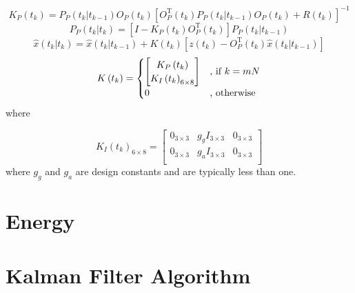 \documentclass[a4paper]{report}
\numberwithin{equation}{chapter}
\begin{document}
\begin{equation}
K_P \left( t_k \right) = P_P \left( t_k | t_{k - 1} \right) O_P \left( t_k \right) \left[ O^{\mathrm{T}}_P \left( t_k \right) P_P \left( t_k | t_{k - 1} \right) O_P \left( t_k \right) + R \left( t_k \right) \right]^{-1}
\end{equation}
\begin{equation}
P_P \left( t_k | t_k \right) = \left[ I - K_P \left( t_k \right) O_P^{\mathrm{T}} \left( t_k \right) \right] P_P \left( t_k | t_{k - 1} \right)
\end{equation}
\begin{equation}
\hat{x} \left( t_k | t_k \right) = \hat{x} \left( t_k | t_{k - 1} \right) + K \left( t_k \right) \left[ z \left( t_k \right) - O_P^{\mathrm{T}} \left( t_k \right) \hat{x} \left( t_k | t_{k - 1} \right) \right]
\end{equation}
\begin{equation}
K \left( t_k \right) = 
\begin{cases}
\begin{bmatrix}
K_P \left( t_k \right)\\
K_I \left( t_k \right)_{6 \times 8}\\
\end{bmatrix}
& \text{, if $ k = mN$} \\
0 & \text{, otherwise}
\end{cases}
\end{equation}
where

\begin{equation}
K_I \left( t_k \right)_{6 \times 8} =
\begin{bmatrix}
0_{3 \times 3} & g_g I_{3 \times 3} & 0_{3 \times 3}\\
0_{3 \times 3} & g_a I_{3 \times 3} & 0_{3 \times 3}\\
\end{bmatrix}
\end{equation}
where $g_g$ and $g_a$ are design constants and are typically less than one.




\clearpage\setcounter{page}{1}
\chapter[Energy]{Energy}

\appendix

\clearpage\setcounter{page}{1}
\chapter[Kalman Filter Algorithm]{Kalman Filter Algorithm}
\end{document}
